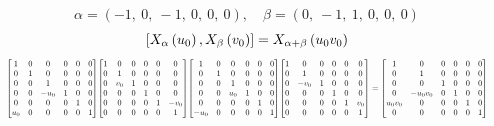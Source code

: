 \documentclass[11pt]{article}
\theoremstyle{definition}
\begin{document}
\[
\alpha = \left( -1, \  0, \  -1, \  0, \  0, \  0\right), \quad \beta = \left( 0, \  -1, \  1, \  0, \  0, \  0\right)
\]
\[
\scaletoalign{\textwidth}{\left[ X_{\alpha}\left(u_{0}\right), X_{\beta}\left(v_{0}\right) \right] = X_{\alpha + \beta}\left(u_{0} v_{0}\right)}
\]
\[
\scaletoalign{\textwidth}{{\left[\begin{matrix}1 & 0 & 0 & 0 & 0 & 0\\0 & 1 & 0 & 0 & 0 & 0\\0 & 0 & 1 & 0 & 0 & 0\\0 & 0 & - u_{0} & 1 & 0 & 0\\0 & 0 & 0 & 0 & 1 & 0\\u_{0} & 0 & 0 & 0 & 0 & 1\end{matrix}\right]} {\left[\begin{matrix}1 & 0 & 0 & 0 & 0 & 0\\0 & 1 & 0 & 0 & 0 & 0\\0 & v_{0} & 1 & 0 & 0 & 0\\0 & 0 & 0 & 1 & 0 & 0\\0 & 0 & 0 & 0 & 1 & - v_{0}\\0 & 0 & 0 & 0 & 0 & 1\end{matrix}\right]} {\left[\begin{matrix}1 & 0 & 0 & 0 & 0 & 0\\0 & 1 & 0 & 0 & 0 & 0\\0 & 0 & 1 & 0 & 0 & 0\\0 & 0 & u_{0} & 1 & 0 & 0\\0 & 0 & 0 & 0 & 1 & 0\\- u_{0} & 0 & 0 & 0 & 0 & 1\end{matrix}\right]} {\left[\begin{matrix}1 & 0 & 0 & 0 & 0 & 0\\0 & 1 & 0 & 0 & 0 & 0\\0 & - v_{0} & 1 & 0 & 0 & 0\\0 & 0 & 0 & 1 & 0 & 0\\0 & 0 & 0 & 0 & 1 & v_{0}\\0 & 0 & 0 & 0 & 0 & 1\end{matrix}\right]} = {\left[\begin{matrix}1 & 0 & 0 & 0 & 0 & 0\\0 & 1 & 0 & 0 & 0 & 0\\0 & 0 & 1 & 0 & 0 & 0\\0 & - u_{0} v_{0} & 0 & 1 & 0 & 0\\u_{0} v_{0} & 0 & 0 & 0 & 1 & 0\\0 & 0 & 0 & 0 & 0 & 1\end{matrix}\right]}}
\]
\end{document}
